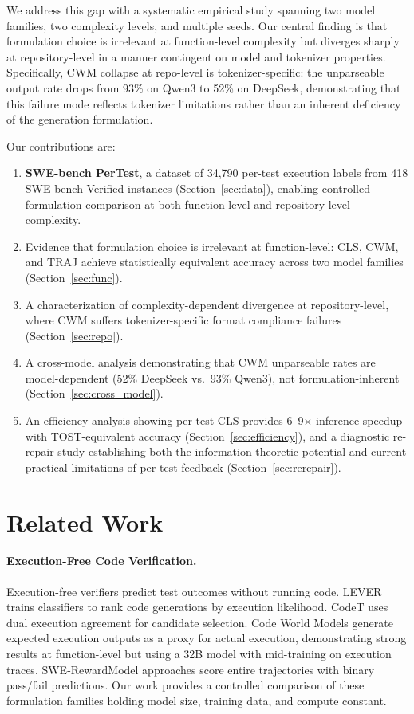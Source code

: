 \documentclass[11pt]{article}
\begin{document}
We address this gap with a systematic empirical study spanning two model families, two complexity levels, and multiple seeds. Our central finding is that formulation choice is irrelevant at function-level complexity but diverges sharply at repository-level in a manner contingent on model and tokenizer properties. Specifically, CWM collapse at repo-level is tokenizer-specific: the unparseable output rate drops from 93\% on Qwen3 to 52\% on DeepSeek, demonstrating that this failure mode reflects tokenizer limitations rather than an inherent deficiency of the generation formulation.

Our contributions are:
\begin{enumerate}
\item \textbf{SWE-bench PerTest}, a dataset of 34,790 per-test execution labels from 418 SWE-bench Verified instances (Section~\ref{sec:data}), enabling controlled formulation comparison at both function-level and repository-level complexity.
\item Evidence that formulation choice is irrelevant at function-level: CLS, CWM, and TRAJ achieve statistically equivalent accuracy across two model families (Section~\ref{sec:func}).
\item A characterization of complexity-dependent divergence at repository-level, where CWM suffers tokenizer-specific format compliance failures (Section~\ref{sec:repo}).
\item A cross-model analysis demonstrating that CWM unparseable rates are model-dependent (52\% DeepSeek vs.\ 93\% Qwen3), not formulation-inherent (Section~\ref{sec:cross_model}).
\item An efficiency analysis showing per-test CLS provides 6--9$\times$ inference speedup with TOST-equivalent accuracy (Section~\ref{sec:efficiency}), and a diagnostic re-repair study establishing both the information-theoretic potential and current practical limitations of per-test feedback (Section~\ref{sec:rerepair}).
\end{enumerate}

\section{Related Work}

\paragraph{Execution-Free Code Verification.}
Execution-free verifiers predict test outcomes without running code. LEVER \citep{ni2023lever} trains classifiers to rank code generations by execution likelihood. CodeT \citep{chen2023codet} uses dual execution agreement for candidate selection. Code World Models \citep{ding2024codeworldmodels} generate expected execution outputs as a proxy for actual execution, demonstrating strong results at function-level but using a 32B model with mid-training on execution traces. SWE-RewardModel approaches \citep{zhang2025swebench} score entire trajectories with binary pass/fail predictions. Our work provides a controlled comparison of these formulation families holding model size, training data, and compute constant.
\end{document}
